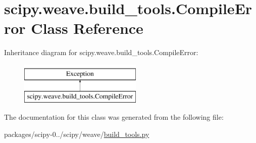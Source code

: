 \hypertarget{classscipy_1_1weave_1_1build__tools_1_1CompileError}{}\section{scipy.\+weave.\+build\+\_\+tools.\+Compile\+Error Class Reference}
\label{classscipy_1_1weave_1_1build__tools_1_1CompileError}
Inheritance diagram for scipy.\+weave.\+build\+\_\+tools.\+Compile\+Error\+:\begin{figure}[H]
\begin{center}
\leavevmode
\includegraphics[height=2.000000cm]{classscipy_1_1weave_1_1build__tools_1_1CompileError}
\end{center}
\end{figure}


The documentation for this class was generated from the following file\+:\begin{DoxyCompactItemize}
\item 
packages/scipy-\/0../scipy/weave/\hyperlink{build__tools_8py}{build\+\_\+tools.\+py}\end{DoxyCompactItemize}
